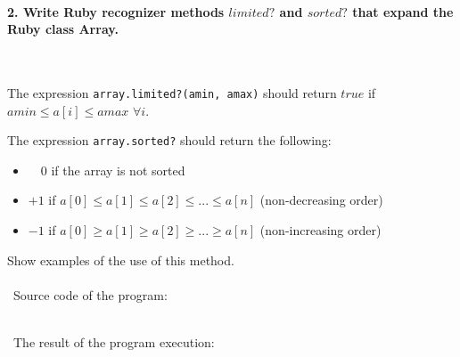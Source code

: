 \documentclass{article}
\begin{document}
	\paragraph{2. Write Ruby recognizer methods \(limited?\) and \(sorted?\) that expand the Ruby class Array.}\ \newline
	
	The expression \texttt{array.limited?(amin, amax)} should return \(true\) if  \(amin  \leqslant  a[i]  \leqslant  amax\) \(\forall i\). \newline
	
	The expression \texttt{array.sorted?} should return the following: 
	\begin{itemize}
		\item \ \ \(0\) \quad  if the array is not sorted
		\item \(+1\) \quad if \(a[0] \leqslant a[1] \leqslant a[2] \leqslant ... \leqslant a[n]\) (non-decreasing order)
		\item \(-1\) \quad if \(a[0] \geqslant a[1] \geqslant a[2] \geqslant ... \geqslant a[n]\) (non-increasing order)
	\end{itemize}
	
	Show examples of the use of this method.

\paragraph{}\	
Source code of the program:

\begin{verbatim} 

\end{verbatim}	

\paragraph{}\
	The result of the program execution:
	
\begin{verbatim} 

\end{verbatim}
	
\paragraph{}\
\paragraph{}\
\end{document}
